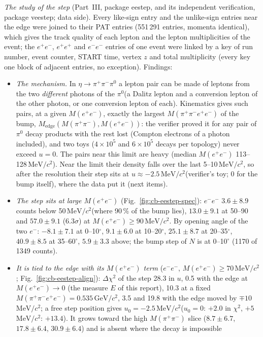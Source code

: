 \documentclass[11pt,a4paper]{article}
\newcommand{\piz}{\ensuremath{\pi^{0}}\xspace}
\newcommand{\pipi}{\ensuremath{\pi^{+}\pi^{-}}\xspace}
\newcommand{\Mfour}{\ensuremath{M(\pi^{+}\pi^{-}e^{+}e^{-})}\xspace}
\newcommand{\Mee}{\ensuremath{M(e^{+}e^{-})}\xspace}
\newcommand{\Mpipi}{\ensuremath{M(\pi^{+}\pi^{-})}\xspace}
\newcommand{\GeVcc}{\ensuremath{\mathrm{GeV}/c^{2}}\xspace}
\newcommand{\MeVcc}{\ensuremath{\mathrm{MeV}/c^{2}}\xspace}
\newcommand{\Medge}{\ensuremath{M_{\mathrm{edge}}}}%
\begin{document}
\emph{The study of the step} (Part~III, package eestep, and its independent verification, package veestep; data side). Every like-sign entry and the unlike-sign entries near the edge were joined to their
PAT entries (551\,291 entries, momenta identical), which gives the track quality of each lepton and the lepton multiplicities of the event; the
$e^+e^-$, $e^+e^+$ and $e^-e^-$ entries of one event were linked by a key of run number, event counter, START time, vertex $z$ and total
multiplicity (every key one block of adjacent entries, no exception). Findings:
\begin{itemize}\setlength{\itemsep}{0pt}
\item \emph{The mechanism.} In $\eta\to\pipi\piz$ a lepton pair can be made of leptons from the two \emph{different} photons of the \piz (a Dalitz
      lepton and a conversion lepton of the other photon, or one conversion lepton of each). Kinematics gives such pairs, at a given \Mee,
      exactly the largest \Mfour of the bump, $\Medge(\Mpipi,\Mee)$: the verifier proved it for any pair of \piz decay products with the rest
      lost (Compton electrons of a photon included), and two toys ($4\times10^5$ and $6\times10^5$ decays per topology) never exceed $u=0$. The
      pairs near this limit are heavy (median \Mee 113--128\,\MeVcc). Near the limit their density falls over the last 5--10\,\MeVcc, so after
      the resolution their step sits at $u\approx-2.5$\,\MeVcc (verifier's toy; 0 for the bump itself), where the data put it (next items).
\item \emph{The step sits at large \Mee} (Fig.~\ref{fig:cb-eestep-spec}): $e^-e^-$ $3.6\pm8.9$ counts below 50\,\MeVcc (where 90\,\% of the bump
      lies), $13.0\pm9.1$ at 50--90 and $57.0\pm9.1$ (6.3$\sigma$) at \Mee$\ge90$\,\MeVcc. By opening angle of the two $e^-$: $-8.1\pm7.1$
      at 0--10$^\circ$, $9.1\pm6.0$ at 10--20$^\circ$, $25.1\pm8.7$ at 20--35$^\circ$, $40.9\pm8.5$ at 35--60$^\circ$, $5.9\pm3.3$ above; the bump
      step of $N$ is at 0--10$^\circ$ (1170 of 1349 counts).
\item \emph{It is tied to the edge with its \Mee term} ($e^-e^-$, \Mee$\ge70$\,\MeVcc; Fig.~\ref{fig:cb-eestep-align}): $\Delta\chi^2$ of the
      step 28.3 in $u$, 0.5 with the edge at $\Mee\to0$ (the measure $E$ of this report), 10.3 at a fixed $\Mfour=0.535$\,\GeVcc, 3.5 and 19.8
      with the edge moved by $\mp10$\,\MeVcc; a free step position gives $u_0=-2.5$\,\MeVcc ($u_0=0$: $+2.0$ in $\chi^2$, $+5$\,\MeVcc:
      $+13.4$). It grows toward the high \Mpipi slice ($8.7\pm6.7$, $17.8\pm6.4$, $30.9\pm6.4$) and is absent where the decay is impossible

\end{itemize}
\end{document}

